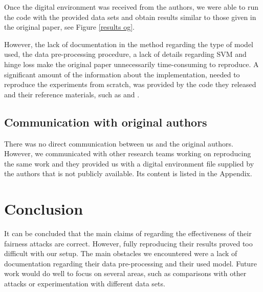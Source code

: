Once the digital environment was received from the authors, we were able to run the code with the provided data sets and obtain results similar to those given in the original paper, see Figure \ref{results og}. 


However, the lack of documentation in the method regarding the type of model used, the data pre-processing procedure, a lack of details regarding SVM and hinge loss make the original paper unnecessarily time-consuming to reproduce. A significant amount of the information about the implementation, needed to reproduce the experiments from scratch, was provided by the code they released and their reference materials, such as \cite{koh2018stronger} and \cite{zafar2015learning}.


\subsection{Communication with original authors}

There was no direct communication between us and the original authors. However, we communicated with other research teams working on reproducing the same work and they provided us with a digital environment file supplied by the authors that is not publicly available. Its content is listed in the Appendix.
 
\section{Conclusion}
It can be concluded that the main claims of \cite{mehrabi2020exacerbating} regarding the effectiveness of their fairness attacks are correct. However, fully reproducing their results proved too difficult with our setup. The main obstacles we encountered were a lack of documentation regarding their data pre-processing and their used model. Future work would do well to focus on several areas, such as comparisons with other attacks or experimentation with different data sets.



